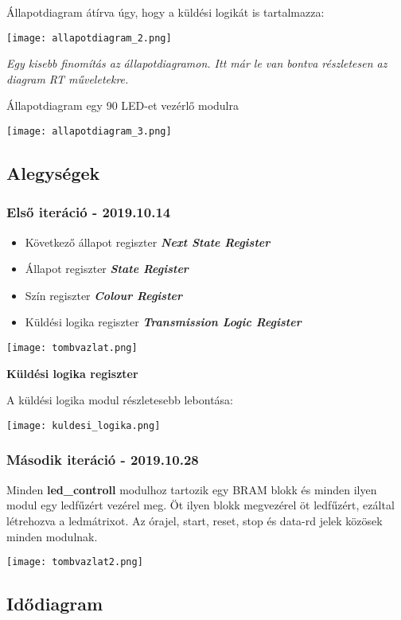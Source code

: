 \tab Állapotdiagram átírva úgy, hogy a küldési logikát is tartalmazza:

\texttt{[image: allapotdiagram\_2.png]}

\tab \textit{Egy kisebb finomítás az állapotdiagramon. Itt már le van bontva részletesen az diagram RT műveletekre.}

\tab Állapotdiagram egy 90 LED-et vezérlő modulra

\texttt{[image: allapotdiagram\_3.png]}


\subsection{Alegységek}

\subsubsection{Első iteráció - 2019.10.14}

\begin{itemize}
\item Következő állapot regiszter \textbf{\textit{Next State Register}}
\item Állapot regiszter \textbf{\textit{State Register}}
\item Szín regiszter \textbf{\textit{Colour Register}}
\item Küldési logika regiszter \textbf{\textit{Transmission Logic Register}}
\end{itemize}

\texttt{[image: tombvazlat.png]}

\tab \textbf{Küldési logika regiszter}

\noindent A küldési logika modul részletesebb lebontása: 

\texttt{[image: kuldesi\_logika.png]}

\subsubsection{Második iteráció - 2019.10.28}

\tab Minden \textbf{led\_controll} modulhoz tartozik egy BRAM blokk és minden ilyen modul egy ledfűzért vezérel meg. Öt ilyen blokk megvezérel öt ledfűzért, ezáltal létrehozva a ledmátrixot.
Az órajel, start, reset, stop és data-rd jelek közösek minden modulnak.

\texttt{[image: tombvazlat2.png]}


\subsection{Idődiagram}

